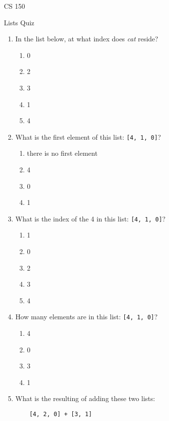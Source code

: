 \documentclass[10pt]{article}
\date{Revision Date: \today}
\begin{document}
\begin{center}
\begin{spacing}{0.75}
{\Large CS}
 {\Large 150}
 
\vspace{0.2in}

 {\large Lists}
 {\large Quiz}

\end{spacing}
\end{center}
\thispagestyle{empty}
\begin{enumerate}
\item
In the list below, at what index does {\it cat} reside? 

\W\newline\W{}
\T


\begin{enumerate}
\item
0
\item
2
\item
3
\item
1
\item
4
\end{enumerate}
\item
What is the first element of this list: {\codesize\verb![4, 1, 0]!}?
\begin{enumerate}
\item
there is no first element
\item
4
\item
0
\item
1
\end{enumerate}
\item
What is the index of the 4 in this list: {\codesize\verb![4, 1, 0]!}?
\begin{enumerate}
\item
1
\item
0
\item
2
\item
3
\item
4
\end{enumerate}
\item
How many elements are in this list: {\codesize\verb![4, 1, 0]!}?
\begin{enumerate}
\item
4
\item
0
\item
3
\item
1
\end{enumerate}
\item
What is the resulting of adding these two lists: 
\color{CodeGreen}
\begin{codesize}
\begin{verbatim}
    [4, 2, 0] + [3, 1]
\end{verbatim}
\end{codesize}
\color{black}


\end{enumerate}
\end{document}
